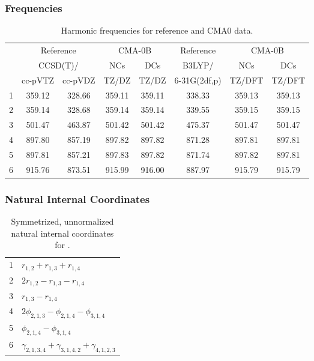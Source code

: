 \documentclass[10pt,oneside]{article}
\begin{document}
\clearpage

\subsubsection*{Frequencies}
\begin{table}[h!]
\centering
\caption{Harmonic frequencies for reference and CMA0 data.}
\begin{tabular}{cccccccc}
\toprule
{} & \multicolumn{2}{c}{Reference} & \multicolumn{2}{c}{CMA-0B} &    Reference & \multicolumn{2}{c}{CMA-0B} \\
{} & \multicolumn{2}{c}{CCSD(T)/} &    NCs &    DCs &       B3LYP/ &    NCs &    DCs \\
{} &   cc-pVTZ & cc-pVDZ &  TZ/DZ &  TZ/DZ & 6-31G(2df,p) & TZ/DFT & TZ/DFT \\
\midrule
1 &    359.12 &  328.66 & 359.11 & 359.11 &       338.33 & 359.13 & 359.13 \\
2 &    359.14 &  328.68 & 359.14 & 359.14 &       339.55 & 359.15 & 359.15 \\
3 &    501.47 &  463.87 & 501.42 & 501.42 &       475.37 & 501.47 & 501.47 \\
4 &    897.80 &  857.19 & 897.82 & 897.82 &       871.28 & 897.81 & 897.81 \\
5 &    897.81 &  857.21 & 897.83 & 897.82 &       871.74 & 897.82 & 897.81 \\
6 &    915.76 &  873.51 & 915.99 & 916.00 &       887.97 & 915.79 & 915.79 \\
\bottomrule
\end{tabular}
\end{table}

\clearpage

\subsubsection*{Natural Internal Coordinates}
\begin{table}[h!]
\centering
\caption{Symmetrized, unnormalized natural internal coordinates for .}
\small
\begin{tabular}{ll}
  1   & $r_{1,2} + r_{1,3} + r_{1,4}$ \\
  2   & $2r_{1,2} - r_{1,3} - r_{1,4}$ \\
  3   & $r_{1,3} - r_{1,4}$ \\
  4   & $2\phi_{2,1,3} - \phi_{2,1,4} - \phi_{3,1,4}$ \\
  5   & $\phi_{2,1,4} - \phi_{3,1,4}$ \\
  6   & $\gamma_{2,1,3,4} + \gamma_{3,1,4,2} + \gamma_{4,1,2,3}$ \\
\end{tabular}
\end{table}
\end{document}
